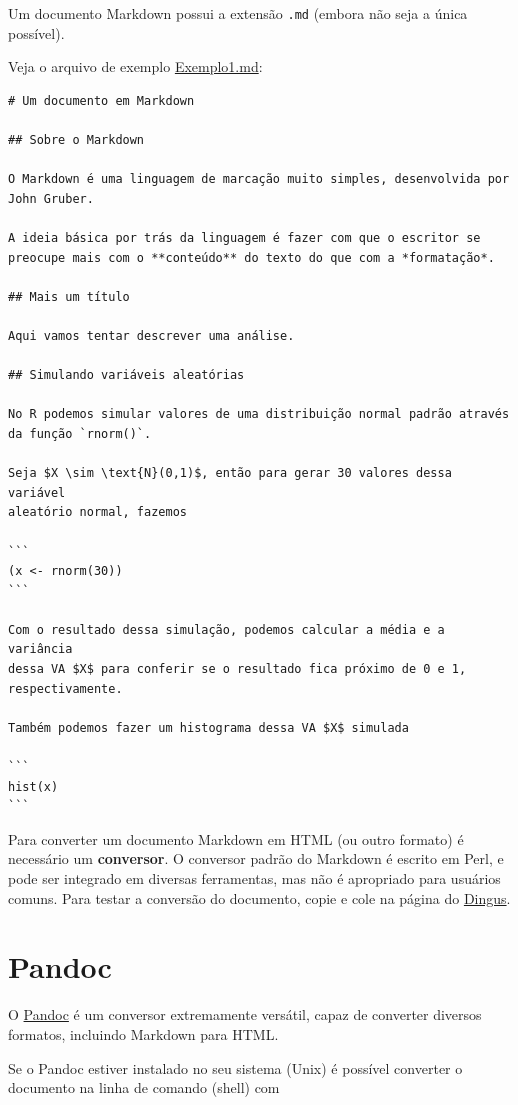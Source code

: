 \documentclass[10pt,a4paper]{book}
\begin{document}
Um documento Markdown possui a extensão \texttt{.md} (embora não seja a
única possível).

Veja o arquivo de exemplo \href{exemplos/Exemplo1.md}{Exemplo1.md}:

\begin{verbatim}
# Um documento em Markdown

## Sobre o Markdown

O Markdown é uma linguagem de marcação muito simples, desenvolvida por
John Gruber.

A ideia básica por trás da linguagem é fazer com que o escritor se
preocupe mais com o **conteúdo** do texto do que com a *formatação*.

## Mais um título

Aqui vamos tentar descrever uma análise.

## Simulando variáveis aleatórias

No R podemos simular valores de uma distribuição normal padrão através
da função `rnorm()`.

Seja $X \sim \text{N}(0,1)$, então para gerar 30 valores dessa variável
aleatório normal, fazemos

```
(x <- rnorm(30))
```

Com o resultado dessa simulação, podemos calcular a média e a variância
dessa VA $X$ para conferir se o resultado fica próximo de 0 e 1,
respectivamente.

Também podemos fazer um histograma dessa VA $X$ simulada

```
hist(x)
```
\end{verbatim}

Para converter um documento Markdown em HTML (ou outro formato) é
necessário um \textbf{conversor}. O conversor padrão do Markdown é
escrito em Perl, e pode ser integrado em diversas ferramentas, mas não é
apropriado para usuários comuns. Para testar a conversão do documento,
copie e cole na página do
\href{http://daringfireball.net/projects/markdown/dingus}{Dingus}.

\section{Pandoc}\label{pandoc}

O \href{http://pandoc.org/}{Pandoc} é um conversor extremamente
versátil, capaz de converter diversos formatos, incluindo Markdown para
HTML.

Se o Pandoc estiver instalado no seu sistema (Unix) é possível converter
o documento na linha de comando (shell) com
\end{document}
